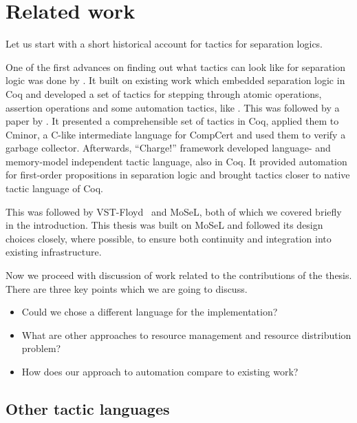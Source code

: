 \chapter{Related work}
\label{cha:related-work}

Let us start with a short historical account for tactics for separation logics.

One of the first advances on finding out what tactics can look like for separation logic was done by \citet{appel2006tactics}.
It built on existing work which embedded separation logic in Coq and developed a set of tactics for stepping through atomic operations, assertion operations and some automation tactics, like .
This was followed by a paper by \citet{mccreightPracticalTacticsSeparation2009}.
It presented a comprehensible set of tactics in Coq, applied them to Cminor, a C-like intermediate language for CompCert and used them to verify a garbage collector.
Afterwards, ``Charge!'' framework \cite{bengtsonCharge2012} developed language- and memory-model independent tactic language, also in Coq.
It provided automation for first-order propositions in separation logic and brought tactics closer to native tactic language of Coq.

This was followed by VST-Floyd~\cite{caoVSTFloydSeparationLogic2018} and MoSeL\cite{krebbersInteractiveProofsHigherorder2017, krebbersMoSeLGeneralExtensible2018}, both of which we covered briefly in the introduction.
This thesis was built on MoSeL and followed its design choices closely, where possible, to ensure both continuity and integration into existing infrastructure.

Now we proceed with discussion of work related to the contributions of the thesis.
There are three key points which we are going to discuss.
\begin{itemize}
\item Could we chose a different language for the implementation?
\item What are other approaches to resource management and resource distribution problem?
\item How does our approach to automation compare to existing work?
\end{itemize}

\section{Other tactic languages}
\label{sec:other-tact-lang}

